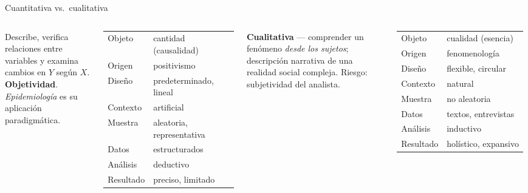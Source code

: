 \documentclass[aspectratio=169,8pt]{beamer}
\begin{document}
\begin{frame}{Cuantitativa vs.\ cualitativa}
  \begin{columns}[T,onlytextwidth]
      \begin{tcolorbox}[formulabox,title=Cuantitativa]
        \footnotesize
        Describe, verifica relaciones entre variables y examina cambios en $Y$ seg\'un $X$. \textbf{Objetividad}.\\[2pt]
        \emph{Epidemiolog\'ia} es su aplicaci\'on paradigm\'atica.
      \end{tcolorbox}
      \vspace{0.3em}
      {\scriptsize
      \begin{tabular}{@{}ll@{}}
        \toprule
        Objeto & cantidad (causalidad)\\
        Origen & positivismo\\
        Dise\~no & predeterminado, lineal\\
        Contexto & artificial\\
        Muestra & aleatoria, representativa\\
        Datos & estructurados\\
        An\'alisis & deductivo\\
        Resultado & preciso, limitado\\
        \bottomrule
      \end{tabular}}
      \begin{tcolorbox}[tealbox]
        \footnotesize\textbf{Cualitativa} --- comprender un fen\'omeno \emph{desde los sujetos}; descripci\'on narrativa de una realidad social compleja. Riesgo: subjetividad del analista.
      \end{tcolorbox}
      \vspace{0.3em}
      {\scriptsize
      \begin{tabular}{@{}ll@{}}
        \toprule
        Objeto & cualidad (esencia)\\
        Origen & fenomenolog\'ia\\
        Dise\~no & flexible, circular\\
        Contexto & natural\\
        Muestra & no aleatoria\\
        Datos & textos, entrevistas\\
        An\'alisis & inductivo\\
        Resultado & hol\'istico, expansivo\\
        \bottomrule
      \end{tabular}}
  \end{columns}
\end{frame}
\end{document}
